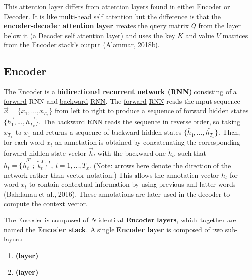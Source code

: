 This \hyperref[sec:AttentionMechanism]{attention layer} differs from attention layers found in either Encoder or Decoder. It is like \hyperref[sec:MultiHeadAttention]{multi-head self attention} but the difference is that the \textbf{encoder-decoder attention layer} creates the query matrix $Q$ from the layer below it (a Decoder self attention layer) and uses the key $K$ and value $V$ matrices from the Encoder stack's output (Alammar, 2018b). 



\subsection{Encoder} \label{sec:TransformerEncoder}

The Encoder is a \textbf{\hyperref[sec:BidirectionalLM]{bidirectional} \hyperref[sec:RNN]{recurrent network (RNN)}} consisting of a \hyperref[sec:ForwardLM]{forward} RNN and \hyperref[sec:BackwardLM]{backward} \hyperref[sec:RNN]{RNN}. The \hyperref[sec:ForwardLM]{forward} \hyperref[sec:RNN]{RNN} reads the input sequence $\overrightarrow{x} = \Big\{ x_1,...,x_{T_x} \Big\}$ from left to right to produce a sequence of forward hidden states $\Big\{ \overrightarrow{h_1},..., \overrightarrow{h_{T_x}} \Big\}$. The \hyperref[sec:BackwardLM]{backward} RNN reads the sequence in reverse order, so taking $x_{T_x}$ to $x_1$ and returns a sequence of backward hidden states $\Big\{ \overleftarrow{h_1},..., \overleftarrow{h_{T_x}} \Big\}$. Then, for each word $x_t$ an annotation is obtained by concatenating the corresponding forward hidden state vector $\overrightarrow{h}_t$ with the backward one $\overleftarrow{h}_t$, such that $h_t = \Big \{ \overrightarrow{h}_t^T \; ; \; \overleftarrow{h}_t^T \Big\}^T , \: t=1,...,T_x$. (Note: arrows here denote the direction of the network rather than vector notation.) This allows the annotation vector $h_t$ for word $x_t$ to contain contextual information by using previous and latter words (Bahdanau et al., 2016). These annotations are later used in the decoder to compute the context vector. \newline

The Encoder is composed of $N$ identical \textbf{Encoder layers}, which together are named the \textbf{Encoder stack}. A single \textbf{Encoder layer}  is composed of two sub-layers: 
\begin{enumerate}
    \item \textbf{  (layer)}
    
    \item \textbf{  (layer)}
\end{enumerate}

